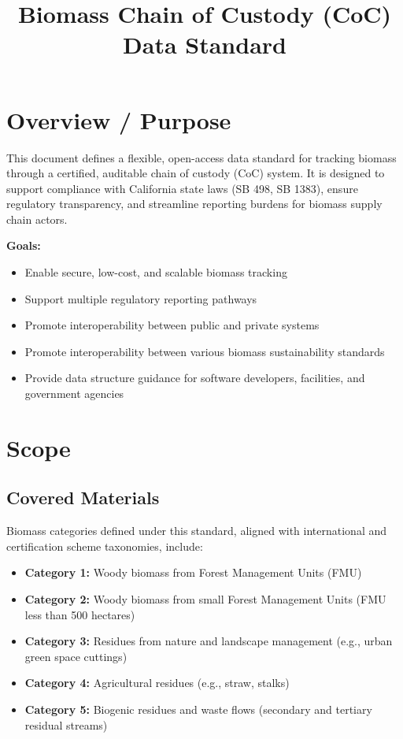 \documentclass{article}
\title{Biomass Chain of Custody (CoC) Data Standard}
\date{}
\begin{document}
\maketitle

\section{Overview / Purpose}
This document defines a flexible, open-access data standard for tracking biomass through a certified, auditable chain of custody (CoC) system. It is designed to support compliance with California state laws (SB 498, SB 1383), ensure regulatory transparency, and streamline reporting burdens for biomass supply chain actors.

\textbf{Goals:}
\begin{itemize}[noitemsep]
    \item Enable secure, low-cost, and scalable biomass tracking
    \item Support multiple regulatory reporting pathways
    \item Promote interoperability between public and private systems
    \item Promote interoperability between various biomass sustainability standards
    \item Provide data structure guidance for software developers, facilities, and government agencies
\end{itemize}

\section{Scope}
\subsection*{Covered Materials}
Biomass categories defined under this standard, aligned with international and certification scheme taxonomies, include:
\begin{itemize}[noitemsep]
    \item \textbf{Category 1:} Woody biomass from Forest Management Units (FMU)
    \item \textbf{Category 2:} Woody biomass from small Forest Management Units (FMU less than 500 hectares)
    \item \textbf{Category 3:} Residues from nature and landscape management (e.g., urban green space cuttings)
    \item \textbf{Category 4:} Agricultural residues (e.g., straw, stalks)
    \item \textbf{Category 5:} Biogenic residues and waste flows (secondary and tertiary residual streams)
\end{itemize}
\end{document}
